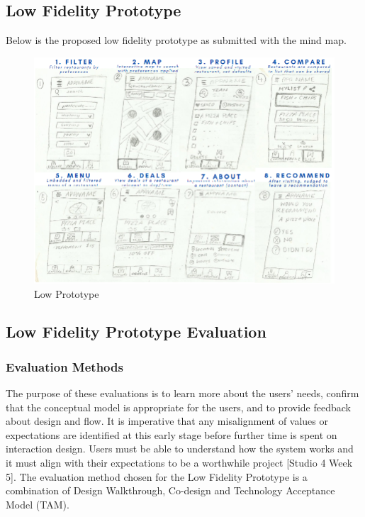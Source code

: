 \documentclass[a4 paper, 12pt]{article}
\begin{document}
    \subsection{Low Fidelity Prototype}
    Below is the proposed low fidelity prototype as submitted with the mind map. 
    \begin{figure} [H]
        \centering
        \includegraphics[width=\textwidth, frame]
            {./Low_Fidelity/Low_Prototype.PNG} 
        \caption{Low Prototype}
    \end{figure}  
    
    
\subsection{Low Fidelity Prototype Evaluation}

\subsubsection{Evaluation Methods}
The purpose of these evaluations is to learn more about the users' needs, confirm that the conceptual model is appropriate for the users, and to provide feedback about design and flow. It is imperative that any misalignment of values or expectations are identified at this early stage before further time is spent on interaction design. Users must be able to understand how the system works and it must align with their expectations to be a worthwhile project [Studio 4 Week 5]. The evaluation method chosen for the Low Fidelity Prototype is a combination of Design Walkthrough, Co-design and Technology Acceptance Model (TAM).
\end{document}
